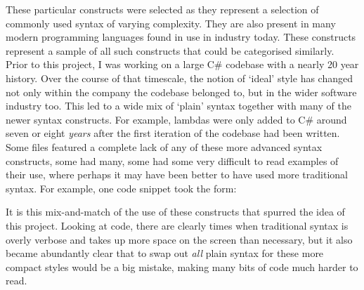 \documentclass{article}
\begin{document}
        These particular constructs were selected as they represent a selection of commonly used syntax of varying complexity. They are also present in many modern programming languages found in use in industry today. These constructs represent a sample of all such constructs that could be categorised similarly.
        \\
        Prior to this project, I was working on a large C\# codebase with a nearly 20 year history. Over the course of that timescale, the notion of `ideal' style has changed not only within the company the codebase belonged to, but in the wider software industry too. This led to a wide mix of `plain' syntax together with many of the newer syntax constructs. For example, lambdas were only added to C\# around seven or eight \emph{years} after the first iteration of the codebase had been written. Some files featured a complete lack of any of these more advanced syntax constructs, some had many, some had some very difficult to read examples of their use, where perhaps it may have been better to have used more traditional syntax. For example, one code snippet took the form:\newline

        \newline
        \indent\indent{}\newline
        \indent\indent{}\newline
        \indent\indent{}\newline
        

        It is this mix-and-match of the use of these constructs that spurred the idea of this project. Looking at code, there are clearly times when traditional syntax is overly verbose and takes up more space on the screen than necessary, but it also became abundantly clear that to swap out \emph{all} plain syntax for these more compact styles would be a big mistake, making many bits of code much harder to read.
\end{document}
